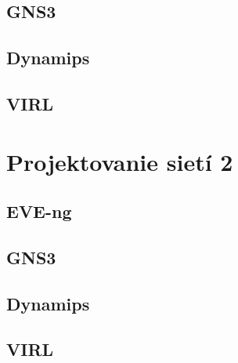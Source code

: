 \subsection{GNS3}
\subsection{Dynamips}
\subsection{VIRL}

\clearpage

\section{Projektovanie sietí 2}
\subsection{EVE-ng}
\subsection{GNS3}
\subsection{Dynamips}
\subsection{VIRL}

%

